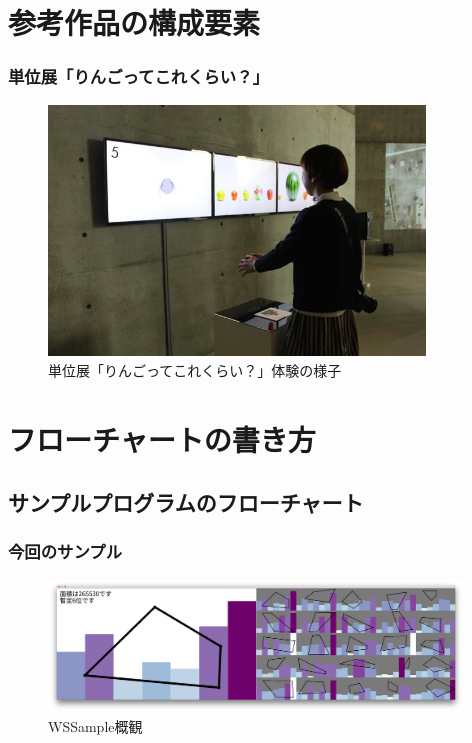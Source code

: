 \documentclass[10pt, dvipdfmx]{beamer}
\begin{document}
    \section{参考作品の構成要素}
        \begin{frame}
            \frametitle{単位展「りんごってこれくらい？」}
                \begin{figure}[htb]
                    \includegraphics[width=100mm]{images/tanniten.jpg}
                    \caption{単位展「りんごってこれくらい？」体験の様子}
                    \label{fig:01}
                \end{figure}
        \end{frame}

        \begin{frame}
        \end{frame}

    \section{フローチャートの書き方}
    \subsection{サンプルプログラムのフローチャート}
        \begin{frame}
            \frametitle{今回のサンプル}
            \begin{figure}[htb]
                \includegraphics[width=110mm]{images/WSSample.png}
                \caption{WSSample概観}
                \label{fig:02}
            \end{figure}
        \end{frame}
\end{document}
